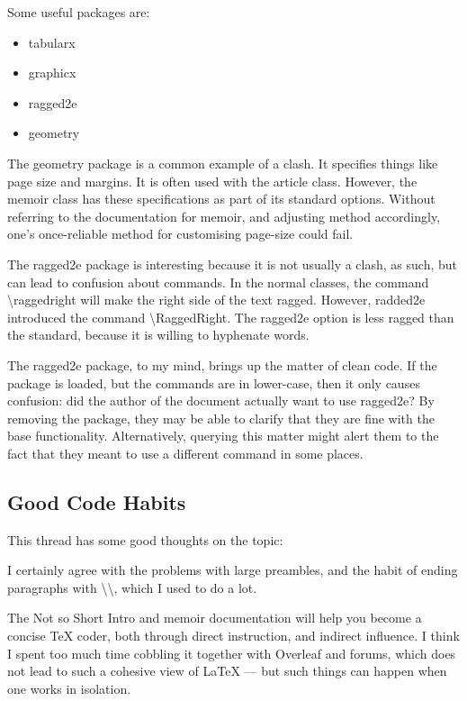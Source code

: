 \documentclass[11pt, oneside]{memoir}
\begin{document}
Some useful packages are:
\begin{itemize}
    \item tabularx
    \item graphicx
    \item ragged2e
    \item geometry
\end{itemize}

The geometry package is a common example of a clash. It specifies things like page size and margins. It is often used with the article class. However, the memoir class has these specifications as part of its standard options. Without referring to the documentation for memoir, and adjusting method accordingly, one's once-reliable method for customising page-size could fail.

The ragged2e package is interesting because it is not usually a clash, as such, but can lead to confusion about commands. In the normal classes, the command \textbackslash raggedright will make the right side of the text ragged. However, radded2e introduced the command \textbackslash RaggedRight. The ragged2e option is less ragged than the standard, because it is willing to hyphenate words.

The ragged2e package, to my mind, brings up the matter of clean code. If the package is loaded, but the commands are in lower-case, then it only causes confusion: did the author of the document actually want to use ragged2e? By removing the package, they may be able to clarify that they are fine with the base functionality. Alternatively, querying this matter might alert them to the fact that they meant to use a different command in some places.

\subsection{Good Code Habits}

This thread has some good thoughts on the topic:

I certainly agree with the problems with large preambles, and the habit of ending paragraphs with \textbackslash \textbackslash , which I used to do a lot.

The Not so Short Intro and memoir documentation will help you become a concise TeX coder, both through direct instruction, and indirect influence. I think I spent too much time cobbling it together with Overleaf and forums, which does not lead to such a cohesive view of LaTeX — but such things can happen when one works in isolation.
\end{document}
